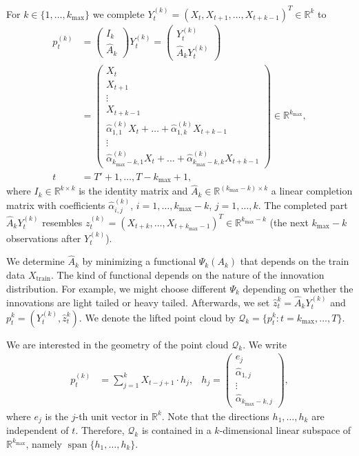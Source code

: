 For $k\in\{1,\dots,k_{\max}\}$ we complete $Y_{t}^{(k)}=(X_t,X_{t+1},\dots,X_{t+k-1})^{T}\in\mathbb{R}^{k}$ to
\begin{align*}
    p_{t}^{(k)}&=\begin{pmatrix}
        I_k\\
        \hat{A}_k
    \end{pmatrix}Y_t^{(k)}=\begin{pmatrix}
        Y_{t}^{(k)}\\
        \hat{A}_kY_{t}^{(k)}
    \end{pmatrix}\\
    &=\begin{pmatrix}
        X_t\\
        X_{t+1}\\
        \vdots\\
        X_{t+k-1}\\
        \hat{\alpha}_{1,1}^{(k)}X_t+\dots+\hat{\alpha}_{1,k}^{(k)}X_{t+k-1}\\
        \vdots\\
        \hat{\alpha}_{k_{\max}-k,1}^{(k)}X_{t}+\dots+\hat{\alpha}_{k_{\max}-k,k}^{(k)}X_{t+k-1}
    \end{pmatrix}\in\mathbb{R}^{k_{\max}},\\
    t&=T'+1,\dots,T-k_{\max}+1,
\end{align*}
where $I_k\in\mathbb{R}^{k\times k}$ is the identity matrix and $\hat{A}_k\in\mathbb{R}^{(k_{\max}-k)\times k}$ a linear completion matrix with coefficients $\hat{\alpha}_{i,j}^{(k)}$, $i=1,\dots,k_{\max}-k$, $j=1,\dots,k$. The completed part $\hat{A}_kY_{t}^{(k)}$ resembles $z_t^{(k)}=(X_{t+k},\dots,X_{t+k_{\max}-1})^{T}\in\mathbb{R}^{k_{\max}-k}$ (the next $k_{\max}-k$ observations after $Y_t^{(k)}$).

We determine $\hat{A}_k$ by minimizing a functional $\Psi_k(A_k)$ that depends on the train data $X_{\text{train}}$. The kind of functional depends on the nature of the innovation distribution. For example, we might choose different $\Psi_k$ depending on whether the innovations are light tailed or heavy tailed. Afterwards, we set $\hat{z}_t^{k}=\hat{A}_kY_{t}^{(k)}$ and $p_t^{k}=(Y_{t}^{(k)},\hat{z}_t^{k})$. We denote the lifted point cloud by $\mathcal{Q}_k=\{p_t^{k}:t=k_{\max},\dots,T\}$.


We are interested in the geometry of the point cloud $\mathcal{Q}_k$. We write
\begin{align*}
    p_t^{(k)}&=\sum_{j=1}^{k}X_{t-j+1}\cdot h_j, & h_j=\begin{pmatrix}
        e_j\\
        \hat{\alpha}_{1,j}\\
        \vdots\\
        \hat{\alpha}_{k_{\max}-k,j}
    \end{pmatrix},
\end{align*}
where $e_j$ is the $j$-th unit vector in $\mathbb{R}^{k}$. Note that the directions $h_1,\dots,h_k$ are independent of $t$. Therefore, $\mathcal{Q}_k$ is contained in a $k$-dimensional linear subspace of $\mathbb{R}^{k_{\max}}$, namely $\operatorname{span}\{h_1,\dots,h_k\}$.

